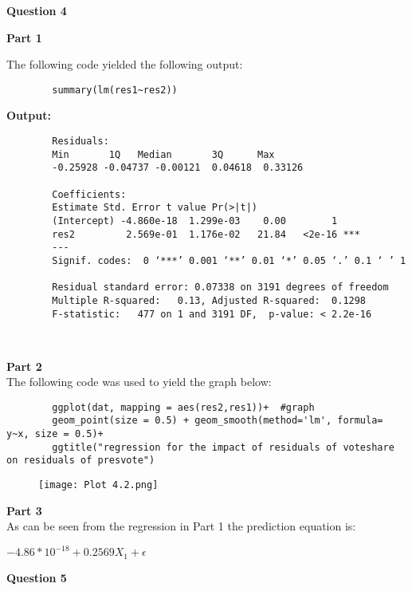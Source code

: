 \documentclass{article}
\begin{document}
		\textbf{\Large Question 4\\}
	
	\noindent\textbf{\large Part 1\\}
	
	The following code yielded the following output:\\
	\begin{verbatim}
		summary(lm(res1~res2))
	\end{verbatim}
	\textbf{Output:}
	\begin{verbatim}
		Residuals:
		Min       1Q   Median       3Q      Max 
		-0.25928 -0.04737 -0.00121  0.04618  0.33126 
		
		Coefficients:
		Estimate Std. Error t value Pr(>|t|)    
		(Intercept) -4.860e-18  1.299e-03    0.00        1    
		res2         2.569e-01  1.176e-02   21.84   <2e-16 ***
		---
		Signif. codes:  0 ‘***’ 0.001 ‘**’ 0.01 ‘*’ 0.05 ‘.’ 0.1 ‘ ’ 1
		
		Residual standard error: 0.07338 on 3191 degrees of freedom
		Multiple R-squared:   0.13,	Adjusted R-squared:  0.1298 
		F-statistic:   477 on 1 and 3191 DF,  p-value: < 2.2e-16
		
		
	\end{verbatim}
	
	
	\textbf{\large Part 2\\}
	The following code was used to yield the graph below:\\
	\begin{verbatim}
		ggplot(dat, mapping = aes(res2,res1))+  #graph
		geom_point(size = 0.5) + geom_smooth(method='lm', formula= y~x, size = 0.5)+
		ggtitle("regression for the impact of residuals of voteshare on residuals of presvote")
	\end{verbatim}
	\pagebreak
	\begin{figure}[h]
		\centering
		\graphicspath{ {c:/Users/User/Documents/PostGrad/Stats/Assignment 3\Assignment 3} }
		\texttt{[image: Plot 4.2.png]}
		
	\end{figure}
	
	
	
	
	
	\textbf{\large Part 3\\}
	As can be seen from the regression in Part 1 the prediction equation is:
	\begin{center}
		$ -4.86*10^{-18} + 0.2569X_{1} + \epsilon $
	\end{center} 
	\pagebreak
	
			\textbf{\Large Question 5\\}
	
\end{document}
